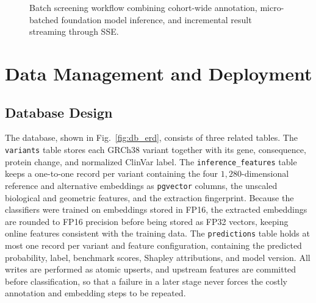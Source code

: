 \begin{figure}[htbp]
    \centering
    \caption{Batch screening workflow combining cohort-wide annotation, micro-batched foundation model inference, and incremental result streaming through SSE.}
    \label{fig:batch_sse}
\end{figure}

\section{Data Management and Deployment}
\label{sec:db_deployment}

\subsection{Database Design}

The database, shown in Fig.~\ref{fig:db_erd}, consists of three related tables. The \texttt{variants} table stores each GRCh38 variant together with its gene, consequence, protein change, and normalized ClinVar label. The \texttt{inference\_features} table keeps a one-to-one record per variant containing the four $1{,}280$-dimensional reference and alternative embeddings as \texttt{pgvector} columns, the unscaled biological and geometric features, and the extraction fingerprint. Because the classifiers were trained on embeddings stored in FP16, the extracted embeddings are rounded to FP16 precision before being stored as FP32 vectors, keeping online features consistent with the training data. The \texttt{predictions} table holds at most one record per variant and feature configuration, containing the predicted probability, label, benchmark scores, Shapley attributions, and model version. All writes are performed as atomic upserts, and upstream features are committed before classification, so that a failure in a later stage never forces the costly annotation and embedding steps to be repeated.

